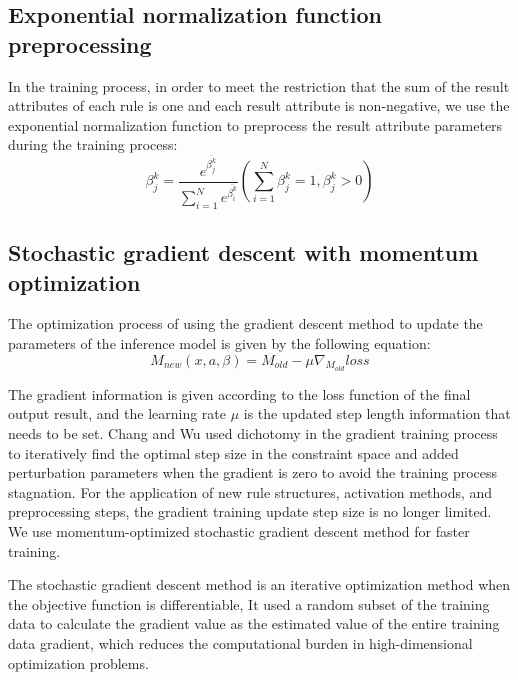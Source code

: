 \documentclass{ieeeaccess}
\begin{document}
\subsection{Exponential normalization function preprocessing}
In the training process, in order to meet the restriction that the sum of the result attributes of each rule is one and each result attribute is non-negative,
we use the exponential normalization function to preprocess the result attribute parameters during the training process:
\begin{equation}
    \beta_j^k=\frac{e^{\overline{\beta_j^k}}}{\sum_{i=1}^Ne^{\overline{\beta_i^k}}}(\sum_{i=1}^N\beta_j^k=1,\beta_j^k>0)
\end{equation}

\subsection{Stochastic gradient descent with momentum optimization}
The optimization process of using the gradient descent method to update the parameters of the inference model is given by the following equation:
\begin{equation}
    M_{new}(x,a,\beta)=M_{old}-\mu\nabla_{M_{old}}loss
\end{equation}

The gradient information is given according to the loss function of the final output result, and the learning rate $\mu$ is the updated step length information that needs to be set.
Chang\cite{a11} and Wu\cite{a13} used dichotomy in the gradient training process to iteratively find the optimal step size in the constraint space and added perturbation parameters when the gradient is zero to avoid the training process stagnation.
For the application of new rule structures, activation methods, and preprocessing steps, the gradient training update step size is no longer limited.
We use momentum-optimized stochastic gradient descent method for faster training.

The stochastic gradient descent method is an iterative optimization method when the objective function is differentiable,
It used a random subset of the training data to calculate the gradient value as the estimated value of the entire training data gradient,
which reduces the computational burden in high-dimensional optimization problems.
\end{document}
